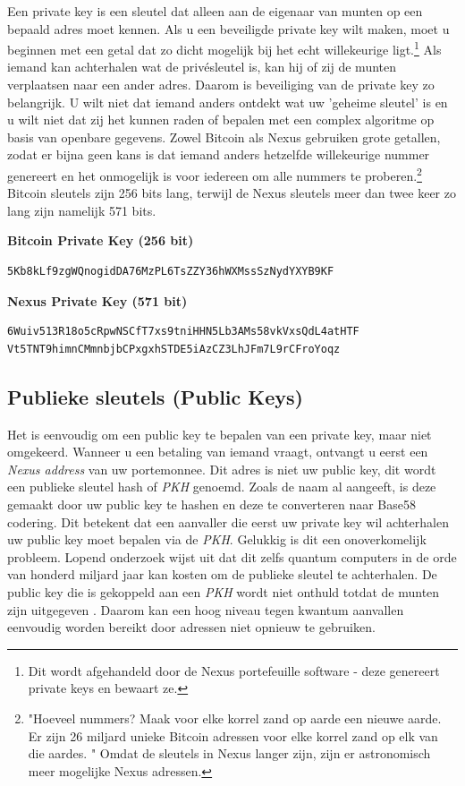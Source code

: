 \documentclass[11pt]{article}
\begin{document}
Een private key is een sleutel dat alleen aan de eigenaar van munten op een bepaald adres moet kennen. 
Als u een beveiligde private key wilt maken, moet u beginnen met een getal dat zo dicht mogelijk bij het echt willekeurige ligt.\footnote{Dit wordt afgehandeld door de Nexus portefeuille software - deze genereert private keys en bewaart ze.}
Als iemand kan achterhalen wat de priv\'esleutel is, kan hij of zij de munten verplaatsen naar een ander adres. Daarom is beveiliging van de private key zo belangrijk. U wilt niet dat iemand anders ontdekt wat uw 'geheime sleutel' is en u wilt niet dat zij het kunnen raden of bepalen met een complex algoritme op basis van openbare gegevens. Zowel Bitcoin als Nexus gebruiken grote getallen, zodat er bijna geen kans is dat iemand anders hetzelfde willekeurige nummer genereert en het onmogelijk is voor iedereen om alle nummers te proberen.\footnote{"Hoeveel nummers? Maak voor elke korrel zand op aarde een nieuwe aarde. Er zijn 26 miljard unieke Bitcoin adressen voor elke korrel zand op elk van die aardes. "\cite{weusesand} Omdat de sleutels in Nexus langer zijn, zijn er astronomisch meer mogelijke Nexus adressen.}
Bitcoin sleutels zijn 256 bits lang, terwijl de Nexus sleutels meer dan twee keer zo lang zijn namelijk 571 bits.

\bigskip
\textbf{Bitcoin Private Key (256 bit)}
\begin{lstlisting}
5Kb8kLf9zgWQnogidDA76MzPL6TsZZY36hWXMssSzNydYXYB9KF
\end{lstlisting}

\bigskip
\textbf{Nexus Private Key (571 bit)}
\begin{lstlisting}
6Wuiv513R18o5cRpwNSCfT7xs9tniHHN5Lb3AMs58vkVxsQdL4atHTF
Vt5TNT9himnCMmnbjbCPxgxhSTDE5iAzCZ3LhJFm7L9rCFroYoqz
\end{lstlisting}

\subsection{Publieke sleutels (Public Keys)}

Het is eenvoudig om een public key te bepalen van een private key, maar niet omgekeerd. Wanneer u een betaling van iemand vraagt, ontvangt u eerst een \textit{Nexus address} van uw portemonnee.
 Dit adres is niet uw public key, dit wordt een publieke sleutel hash of \textit{PKH} genoemd.
Zoals de naam al aangeeft, is deze gemaakt door uw public key te hashen en deze te converteren naar Base58 codering. Dit betekent dat een aanvaller die eerst uw private key wil achterhalen uw public key moet bepalen via de \textit{PKH}.
Gelukkig is dit een onoverkomelijk probleem. Lopend onderzoek wijst uit dat dit zelfs quantum computers in de orde van honderd miljard jaar \cite{registersha3,cryptosha3} kan kosten om de publieke sleutel te achterhalen.
 De public key die is gekoppeld aan een \textit{PKH} wordt niet onthuld totdat de munten zijn uitgegeven \cite{bitcorepkh}.
Daarom kan een hoog niveau tegen kwantum aanvallen eenvoudig worden bereikt door adressen niet opnieuw te gebruiken.\\
\end{document}
